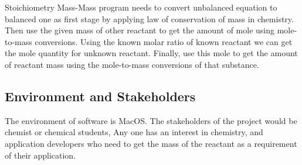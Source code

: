 \documentclass{article}
\begin{document}
Stoichiometry Mass-Mass program needs to convert unbalanced equation to balanced one as first stage by applying law of conservation of mass in chemistry. Then use the given mass of other reactant to get the amount of mole using mole-to-mass conversions. Using the known molar ratio of known reactant we can get the mole quantity for unknown reactant. Finally, use this mole to get the amount of reactant mass using the mole-to-mass conversions of that substance.
 \subsection*{Environment and Stakeholders}
 The environment of software is MacOS. The stakeholders of the project would be chemist or chemical students, Any one has an interest in chemistry, and application developers who need to get the mass of the reactant as a requirement of their application.
 
\end{document}
